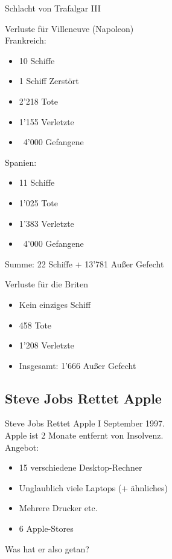 \documentclass[12pt,compress,ngerman,utf8,t]{beamer}
\begin{document}
\begin{frame}{Schlacht von Trafalgar III}
    \begin{multicols}{2}
        Verluste für Villeneuve (Napoleon) \\
        Frankreich:
        \begin{itemize}
            \item<2-> 10 Schiffe
            \item<2-> 1 Schiff Zerstört
            \item<3-> 2'218 Tote
            \item<3-> 1'155 Verletzte
            \item<4-> ~4'000 Gefangene
        \end{itemize}
        Spanien:
        \begin{itemize}
            \item<2-> 11 Schiffe
            \item<3-> 1'025 Tote
            \item<3-> 1'383 Verletzte
            \item<4-> ~4'000 Gefangene
        \end{itemize}
         {Summe: 22 Schiffe + 13'781 Außer Gefecht}


        Verluste für die Briten
        \begin{itemize}
            \item<2-> Kein einziges Schiff
            \item<3-> 458 Tote
            \item<3-> 1'208 Verletzte
            \item<5-> Insgesamt: 1'666 Außer Gefecht
        \end{itemize}

        \pause
        \pause
        \pause
        \pause

    \end{multicols}

\end{frame}



\subsection{Steve Jobs Rettet Apple}

\begin{frame}{Steve Jobs Rettet Apple I}
    September 1997. \\
    Apple ist 2 Monate entfernt von Insolvenz. \\
    \pause
    Angebot: \\
    \begin{itemize}
        \item 15 verschiedene Desktop-Rechner
        \item Unglaublich viele Laptops (+ ähnliches)
        \item Mehrere Drucker etc.
        \item 6 Apple-Stores
    \end{itemize}
    \pause

    Was hat er also getan?

\end{frame}
\end{document}
